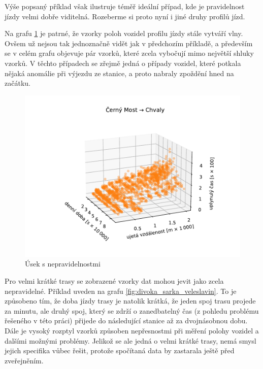 Výše popsaný příklad však ilustruje téměř ideální případ, kde je pravidelnost jízdy velmi dobře viditelná. Rozeberme si proto nyní i jiné druhy profilů jízd.


\bigbreak


Na grafu \ref{fig:cerny_most_chvaly} je patrné, že vzorky poloh vozidel profilu jízdy stále vytváří vlny. Ovšem už nejsou tak jednoznačně vidět jak v předchozím příkladě, a především se v celém grafu objevuje pár vzorků, které zcela vybočují mimo největší shluky vzorků. V těchto případech se zřejmě jedná o případy vozidel, které potkala nějaká anomálie při výjezdu ze stanice, a proto nabraly zpoždění hned na začátku.


\begin{figure}
\centering
  \includegraphics[width=\linewidth]{../img/4383_2712}
  \caption{Úsek s nepravidelnostmi}
  \label{fig:cerny_most_chvaly}
\end{figure}


Pro velmi krátké trasy se zobrazené vzorky dat mohou jevit jako zcela nepravidelné. Příklad uveden na grafu \ref{fig:divoka_sarka_veleslavin}. To je způsobeno tím, že doba jízdy trasy je natolik krátká, že jeden spoj trasu projede za minutu, ale druhý spoj, který se zdrží o zanedbatelný čas (z pohledu problému řešeného v této práci) přijede do následující stanice až za dvojnásobnou dobu. Dále je vysoký rozptyl vzorků způsoben nepřesnostmi při měření polohy vozidel a dalšími možnými problémy. Jelikož se ale jedná o velmi krátké trasy, nemá smysl jejich specifika vůbec řešit, protože spočítaná data by zastarala ještě před zveřejněním.


